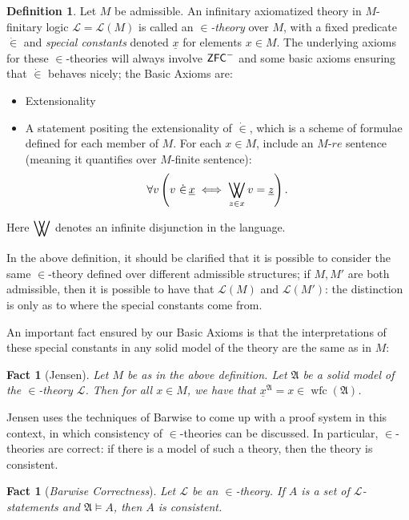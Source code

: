 \documentclass{amsart}
\newtheorem{fact}[theorem]{Fact}
\theoremstyle{definition}
\newtheorem{definition}[theorem]{Definition}
\theoremstyle{remark}
\newcommand{\ZFC}{\textup{\ensuremath{\textsf{ZFC}}}}
\DeclareMathOperator{\wfc}{wfc}
\DeclareMathOperator*{\bigdoublevee}{\bigvee\mkern-15mu\bigvee}
\begin{document}
\begin{definition} \label{def:InTheoriesAndBasicAxioms} Let $M$ be admissible. An infinitary axiomatized theory in $M$-finitary logic $\mathcal L = \mathcal L(M)$ is called an \textit{$\in$-theory} over $M$, with a fixed predicate $\dot \in$ and \emph{special constants} denoted $\underline x$ for elements $x \in M$. The underlying axioms for these $\in$-theories will always involve $\ZFC^-$ and some basic axioms ensuring that $\dot \in$ behaves nicely; 
the \textsf{Basic Axioms} are: \begin{itemize}
	\item \textsf{Extensionality}
	\item A statement positing the extensionality of $\dot \in$, which is a scheme of formulae defined for each member of $M$. For each $x \in M$, include an $M$-$re$ sentence (meaning it quantifies over $M$-finite sentence): 
	$$\forall v \left( v \ \dot \in\, \underline x \iff \bigdoublevee_{z \in x} v= \underline z \right).$$
\end{itemize} Here $\displaystyle\bigdoublevee$ denotes an infinite disjunction in the language.\end{definition}

In the above definition, it should be clarified that it is possible to consider the same $\in$-theory defined over different admissible structures; if $M, M'$ are both admissible, then it is possible to have that $\mathcal L(M)$ and $\mathcal L(M')$: the distinction is only as to where the special constants come from. 

An important fact ensured by our \textsf{Basic Axioms} is that the interpretations of these special constants in any solid model of the theory are the same as in $M$:

\begin{fact}[Jensen] Let $M$ be as in the above definition. Let $\mathfrak A$ be a solid model of the $\in$-theory $\mathcal L$. Then for all $x \in M$, we have that $\underline{x}^{\mathfrak A} = x \in \wfc(\mathfrak A)$. \end{fact}

Jensen uses the techniques of Barwise to come up with a proof system in this context, in which consistency of $\in$-theories can be discussed. In particular, $\in$-theories are correct: if there is a model of such a theory, then the theory is consistent. 
\begin{fact}[\emph{Barwise Correctness}] \label{fact:correctness} 
Let $\mathcal L$ be an $\in$-theory. If $A$ is a set of $\mathcal L$-statements and $\mathfrak A \models A$, then $A$ is consistent. \end{fact}
\end{document}
